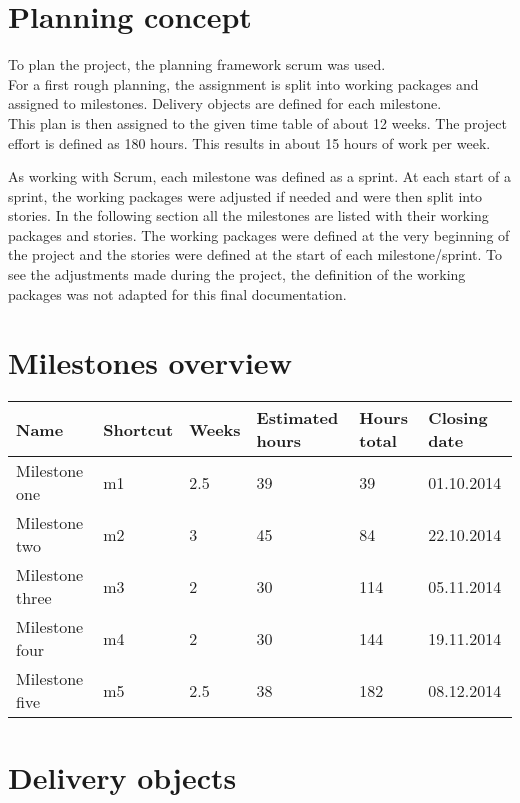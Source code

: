 \section{Planning concept}

To plan the project, the planning framework scrum was used.\\
For a first rough planning, the assignment is split into working packages and assigned to milestones. Delivery objects are defined for each milestone.\\
This plan is then assigned to the given time table of about 12 weeks. The project effort is defined as 180 hours. This results in about 15 hours of work per week.

As working with Scrum, each milestone was defined as a sprint. At each start of a sprint, the working packages were adjusted if needed and were then split into stories. In the following section all the milestones are listed with their working packages and stories. The working packages were defined at the very beginning of the project and the stories were defined at the start of each milestone/sprint. To see the adjustments made during the project, the definition of the working packages was not adapted for this final documentation.
 

\section{Milestones overview}

	\begin{tabular}{ | p{3cm} | p{2cm} | p{2cm} | p{2cm} | p{2cm} | p{2cm} |}
	\hline
	\textbf{Name} & \textbf{Shortcut} & \textbf{Weeks} & \textbf{Estimated hours} & \textbf{Hours  \mbox{total}} & \textbf{Closing date} \\ \hline
	Milestone one & m1 & 2.5 & 39 & 39 & 01.10.2014 \\
	Milestone two & m2 & 3 & 45 & 84 & 22.10.2014 \\
	Milestone three & m3 & 2 & 30 & 114 & 05.11.2014 \\
	Milestone four & m4 & 2 & 30 & 144 & 19.11.2014 \\
	Milestone five & m5 & 2.5 & 38 & 182 & 08.12.2014 \\
	\hline
	\end{tabular}


\section{Delivery objects}

